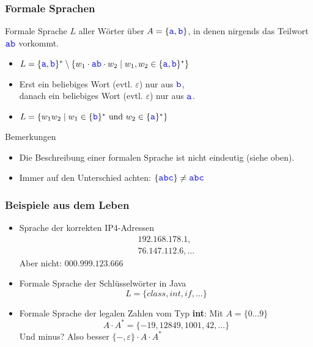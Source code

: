 \begin{frame}
	\frametitle{Formale Sprachen}
	
	\begin{Beispiel}
		Formale Sprache $L$ aller Wörter über $A=\{\literal{a},\literal{b}\}$, in denen nirgends das Teilwort $\literal{ab}$ vorkommt.
		\begin{itemize}
			\pause
			\item $L=\{\literal{a},\literal{b}\}^*
			\setminus \{w_1 \cdot \literal{ab} \cdot w_2 \mid w_1,w_2\in
			\{\literal{a},\literal{b}\}^*\}$
			
			\pause
			\item Erst ein beliebiges Wort (evtl. $\varepsilon$) nur aus $\literal{b}$,\\
			danach ein beliebiges Wort (evtl. $\varepsilon$) nur aus $\literal{a}$.
			
			\pause
			\item $L=\{w_1w_2 \mid w_1\in 
			\{\literal{b}\}^*  \text{ und }  w_2\in \{\literal{a}\}^* \}$
		\end{itemize}
	\end{Beispiel}

	\begin{block}{Bemerkungen}
		\begin{itemize}
			\pause
			\item Die Beschreibung einer formalen Sprache ist nicht eindeutig (siehe oben).
			\pause
			\item Immer auf den Unterschied achten: $\{\literal{abc} \} \neq \literal{abc} $
		\end{itemize}
	\end{block}
\end{frame}


\begin{frame}
	\frametitle{Beispiele aus dem Leben}
	\begin{itemize}
		\item Sprache der korrekten IP4-Adressen \pause
		\begin{align*}
		192.168.178.1,\\
		76.147.112.6, ...
		\end{align*} 
		\pause Aber nicht: $000.999.123.666$ \pause
		\item Formale Sprache der Schlüsselwörter in Java $$L = \{ class, int , if, \dots \}$$ \pause
		\item Formale Sprache der legalen Zahlen vom Typ \textbf{int}: Mit $A = \{0...9\}$ 
		\pause $$A \cdot A^* = \{-19, 12849, 1001, 42, ...\}$$ 
		\pause Und minus? Also besser $ \{ -, \varepsilon \} \cdot A \cdot A^*$
	\end{itemize}
\end{frame}


